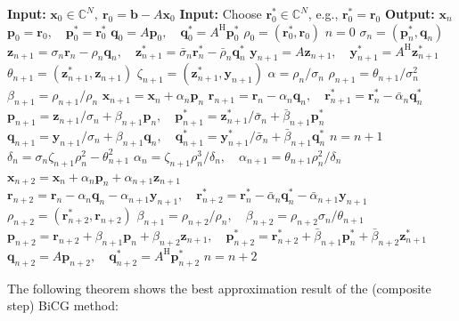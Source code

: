 \begin{algorithm}[H]\caption{{The Composite Step BiCG method}}\label{alg:composite-step-bicg}\begin{algorithmic}[1]
\Statex\textbf{Input:} $\bm x_0\in\mathbb C^N,\ \bm r_0=\bm b-A\bm x_0$
\Statex\textbf{Input:} {Choose $\bm r_0^{*}\in\mathbb C^N$, e.g., $\bm r_0^{*}=\bm r_0$}
\Statex\textbf{Output:} $\bm x_n$
\State $\bm p_0=\bm r_0,\quad\bm p_0^{*}=\bm r_0^{*}$
\State $\bm q_0=A\bm p_0,\quad\bm q_0^{*}=A^{\mathrm H}\bm p_0^{*}$
\State $\rho_0=(\bm r_0^{*},\bm r_0)$
\State $n=0$
\State $\sigma_n=(\bm p_n^{*},\bm q_n)$
\State $\bm z_{n+1}=\sigma_n\bm r_n-\rho_n\bm q_n,\quad\bm z_{n+1}^{*}=\bar\sigma_n\bm r_n^{*}-\bar\rho_n\bm q_n^{*}$
\State $\bm y_{n+1}=A\bm z_{n+1},\quad\bm y_{n+1}^{*}=A^{\mathrm H}\bm z_{n+1}^{*}$
\State $\theta_{n+1}=(\bm z_{n+1}^{*},\bm z_{n+1})$
\State $\zeta_{n+1}=(\bm z_{n+1}^{*},\bm y_{n+1})$
\State $\alpha=\rho_n/\sigma_n$
\State $\rho_{n+1}=\theta_{n+1}/\sigma_n^2$
\State $\beta_{n+1}=\rho_{n+1}/\rho_n$
\State $\bm x_{n+1}=\bm x_n+\alpha_n\bm p_n$
\State $\bm r_{n+1}=\bm r_n-\alpha_n\bm q_n,\quad\bm r_{n+1}^{*}=\bm r_n^{*}-\bar\alpha_n\bm q_n^{*}$
\State $\bm p_{n+1}=\bm z_{n+1}/\sigma_n+\beta_{n+1}\bm p_n,\quad\bm p_{n+1}^{*}=\bm z_{n+1}^{*}/\bar\sigma_n+\bar\beta_{n+1}\bm p_n^{*}$
\State $\bm q_{n+1}=\bm y_{n+1}/\sigma_n+\beta_{n+1}\bm q_n,\quad\bm q_{n+1}^{*}=\bm y_{n+1}^{*}/\bar\sigma_n+\bar\beta_{n+1}\bm q_n^{*}$
\State $n=n+1$
\EndIf
{}
\State $\delta_n=\sigma_n\zeta_{n+1}\rho_n^2-\theta_{n+1}^2$
\State $\alpha_n=\zeta_{n+1}\rho_n^3/\delta_n,\quad\alpha_{n+1}=\theta_{n+1}\rho_n^2/\delta_n$
\State $\bm x_{n+2}=\bm x_n+\alpha_n\bm p_n+\alpha_{n+1}\bm z_{n+1}$
\State $\bm r_{n+2}=\bm r_n-\alpha_n\bm q_n-\alpha_{n+1}\bm y_{n+1},\quad\bm r_{n+2}^{*}=\bm r_n^{*}-\bar\alpha_n\bm q_n^{*}-\bar\alpha_{n+1}\bm y_{n+1}$
\State $\rho_{n+2}=(\bm r_{n+2}^{*},\bm r_{n+2})$
\State $\beta_{n+1}=\rho_{n+2}/\rho_n,\quad\beta_{n+2}=\rho_{n+2}\sigma_n/\theta_{n+1}$
\State $\bm p_{n+2}=\bm r_{n+2}+\beta_{n+1}\bm p_n+\beta_{n+2}\bm z_{n+1},\quad\bm p_{n+2}^{*}=\bm r_{n+2}^{*}+\bar\beta_{n+1}\bm p_n^{*}+\bar\beta_{n+2}\bm z_{n+1}^{*}$
\State $\bm q_{n+2}=A\bm p_{n+2},\quad\bm q_{n+2}^{*}=A^{\mathrm H}\bm p_{n+2}^{*}$
\State $n=n+2$
\EndIf\EndWhile\end{algorithmic}\end{algorithm}
{The following theorem shows the best approximation result of the (composite step) BiCG method:}
